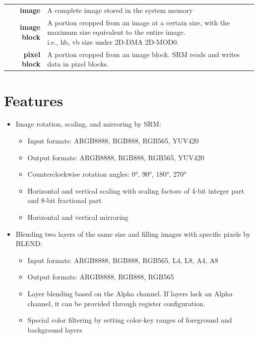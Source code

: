 \documentclass[main\_\_EN.tex]{subfiles}
\begin{document}
\begin{longtable}[c]{ r l }
     \textbf{image} & A complete image stored in the system memory \\
     \textbf{image block} & \makecell[l]{A portion cropped from an image at a certain size, with the maximum size equivalent to the entire image.\\i.e., hb, vb size under 2D-DMA 2D-MOD0.} \\
     \textbf{pixel block} & A portion cropped from an image block. SRM reads and writes data in pixel blocks. \\
\end{longtable}



\section{Features}

\begin{itemize}
    \item Image rotation, scaling, and mirroring by SRM:
        \begin{itemize}
            \item Input formats: ARGB8888, RGB888, RGB565, YUV420
            \item Output formats: ARGB8888, RGB888, RGB565, YUV420
            \item Counterclockwise rotation angles: 0°, 90°, 180°, 270°
            \item Horizontal and vertical scaling with scaling factors of 4-bit integer part and 8-bit fractional part
            \item Horizontal and vertical mirroring
        \end{itemize}
    \item Blending two layers of the same size and filling images with specific pixels by BLEND:
        \begin{itemize}
            \item Input formats: ARGB8888, RGB888, RGB565, L4, L8, A4, A8
            \item Output formats: ARGB8888, RGB888, RGB565
            \item Layer blending based on the Alpha channel. If layers lack an Alpha channel, it can be provided through register configuration.
            \item Special color filtering by setting color-key ranges of foreground and background layers
        \end{itemize}
\end{itemize}
\end{document}
